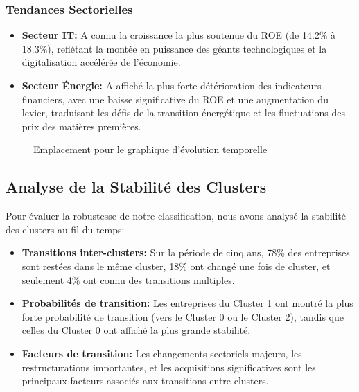 \subsubsection{Tendances Sectorielles}
\begin{itemize}
    \item \textbf{Secteur IT:} A connu la croissance la plus soutenue du ROE (de 14.2\% à 18.3\%), reflétant la montée en puissance des géants technologiques et la digitalisation accélérée de l'économie.
    
    \item \textbf{Secteur Énergie:} A affiché la plus forte détérioration des indicateurs financiers, avec une baisse significative du ROE et une augmentation du levier, traduisant les défis de la transition énergétique et les fluctuations des prix des matières premières.
\end{itemize}

\begin{figure}[H]
    \centering
    \caption{Emplacement pour le graphique d'évolution temporelle}
    \label{fig:time_trends}
\end{figure}

\subsection{Analyse de la Stabilité des Clusters}
Pour évaluer la robustesse de notre classification, nous avons analysé la stabilité des clusters au fil du temps:

\begin{itemize}
    \item \textbf{Transitions inter-clusters:} Sur la période de cinq ans, 78\% des entreprises sont restées dans le même cluster, 18\% ont changé une fois de cluster, et seulement 4\% ont connu des transitions multiples.
    
    \item \textbf{Probabilités de transition:} Les entreprises du Cluster 1 ont montré la plus forte probabilité de transition (vers le Cluster 0 ou le Cluster 2), tandis que celles du Cluster 0 ont affiché la plus grande stabilité.
    
    \item \textbf{Facteurs de transition:} Les changements sectoriels majeurs, les restructurations importantes, et les acquisitions significatives sont les principaux facteurs associés aux transitions entre clusters.
\end{itemize}

